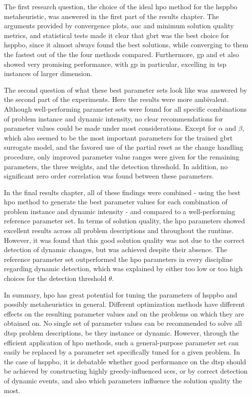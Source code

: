 The first research question, the choice of the ideal \gls{hpo} method for the \gls{hsppbo} metaheuristic, was answered in the first part of the results chapter. The arguments provided by convergence plots, \gls{auc} and minimum solution quality metrics, and statistical tests made it clear that \gls{gbrt} was the best choice for \gls{hsppbo}, since it almost always found the best solutions, while converging to them the fastest out of the the four methods compared. Furthermore, \gls{gp} and \gls{et} also showed very promising performance, with \gls{gp} in particular, excelling in \gls{tsp} instances of larger dimension.

The second question of what these best parameter sets look like was answered by the second part of the experiments. Here the results were more ambivalent. Although well-performing parameter sets were found for all specific combinations of problem instance and dynamic intensity, no clear recommendations for parameter values  could be made under most considerations. Except for $\alpha$ and $\beta$, which also seemed to be the most important parameters for the trained \gls{gbrt} surrogate model, and the favored use of the partial reset as the change handling procedure, only improved parameter value ranges were given for the remaining parameters, the three weights, and the detection threshold. In addition, no significant zero order correlation was found between these parameters. 

In the final results chapter, all of these findings were combined - using the best \gls{hpo} method to generate the best parameter values for each combination of problem instance and dynamic intensity - and compared to a well-performing reference parameter set. In terms of solution quality, the \gls{hpo} parameters showed excellent results across all problem descriptions and throughout the runtime. However, it was found that this good solution quality was not due to the correct detection of dynamic changes, but was achieved despite their absence. The reference parameter set outperformed the \gls{hpo} parameters in every discipline regarding dynamic detection, which was explained by either too low or too high choices for the detection threshold $\theta$.

In summary, \gls{hpo} has great potential for tuning the parameters of \gls{hsppbo} and possibly metaheuristics in general. Different optimization methods have different effects on the resulting parameter values and on the problems on which they are obtained on. No single set of parameter values can be recommended to solve all \gls{dtsp} problem descriptions, be they instance or dynamic. However, through the efficient application of \gls{hpo} methods, such a general-purpose parameter set can easily be replaced by a parameter set specifically tuned for a given problem. In the case of \gls{hsppbo}, it is debatable whether good performance on the \gls{dtsp} should be achieved by constructing highly greedy-influenced \glspl{sce}, or by correct detection of dynamic events, and also which parameters influence the solution quality the most.

